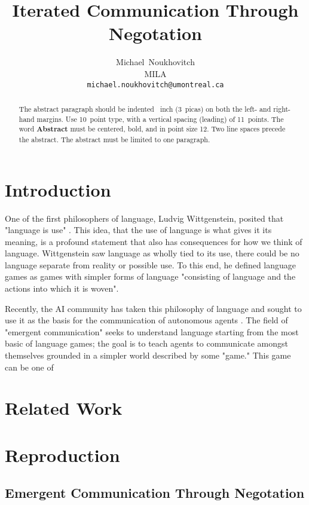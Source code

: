 \documentclass{article}
\title{Iterated Communication Through Negotation}
\author{
  Michael~Noukhovitch\\
  MILA\\
  \texttt{michael.noukhovitch@umontreal.ca} \\
}
\begin{document}
\maketitle

\begin{abstract}
  The abstract paragraph should be indented ~inch
  (3~picas) on both the left- and right-hand margins. Use 10~point
  type, with a vertical spacing (leading) of 11~points.  The word
  \textbf{Abstract} must be centered, bold, and in point size 12. Two
  line spaces precede the abstract. The abstract must be limited to
  one paragraph.
\end{abstract}

\section{Introduction}

One of the first philosophers of language, Ludvig Wittgenstein, posited that
"language is use" \cite{wittgenstein2009philosophical}. This idea, that the use
of language is what gives it its meaning, is a profound statement that also has
consequences for how we think of language. Wittgenstein saw language as wholly
tied to its use, there could be no language separate from reality or possible
use. To this end, he defined language games as games with simpler forms of
language "consisting of language and the actions into which it is woven".

Recently, the AI community has taken this philosophy of language and sought to
use it as the basis for the communication of autonomous agents
\cite{wagner2003progress}. The field of "emergent communication" seeks to
understand language starting from the most basic of language games; the goal is
to teach agents to communicate amongst themselves grounded in a simpler world
described by some "game." This game can be one of

\section{Related Work}%
\label{sec:related_work}

\section{Reproduction}%
\label{sec:reproduction}

\subsection{Emergent Communication Through Negotation}%
\label{sub:emergent_communication_through_negotation}
\end{document}
